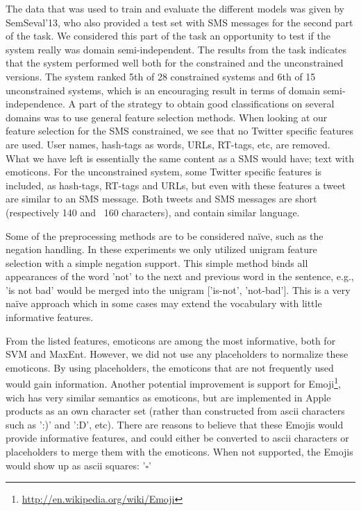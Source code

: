 The data that was used to train and evaluate the different models was given by SemSeval'13, who also provided a test set with SMS messages for the second part of the task. We considered this part of the task an opportunity to test if the system really was domain semi-independent. The results from the task indicates that the system performed well both for the constrained and the unconstrained versions. The system ranked 5th of 28 constrained systems and 6th of 15 unconstrained systems, which is an encouraging result in terms of domain semi-independence. A part of the strategy to obtain good classifications on several domains was to use general feature selection methods. When looking at our feature selection for the SMS constrained, we see that no Twitter specific features are used. User names, hash-tags as words, URLs, RT-tags, etc, are removed. What we have left is essentially the same content as a SMS would have; text with emoticons. For the unconstrained system, some Twitter specific features is included, as hash-tags, RT-tags and URLs, but even with these features a tweet are similar to an SMS message. Both tweets and SMS messages are short (respectively 140 and ~160 characters), and contain similar language. 

Some of the preprocessing methods are to be considered na\"{i}ve, such as the negation handling. In these experiments we only utilized unigram feature selection with a simple negation support. This simple method binds all appearances of the word 'not' to the next and previous word in the sentence, e.g., 'is not bad' would be merged into the unigram ['is-not', 'not-bad']. This is a very na\"{i}ve approach which in some cases may extend the vocabulary with little informative features.

From the listed features, emoticons are among the most informative, both for SVM and MaxEnt. However, we did not use any placeholders to normalize these emoticons. By using placeholders, the emoticons that are not frequently used would gain information. Another potential improvement is support for Emoji\footnote{\url{http://en.wikipedia.org/wiki/Emoji}}, wich has very similar semantics as emoticons, but are implemented in Apple products as an own character set (rather than constructed from ascii characters such as ':)' and ':D', etc). There are reasons to believe that these Emojis would provide informative features, and could either be converted to ascii characters or placeholders to merge them with the emoticons. When not supported, the Emojis would show up as ascii squares: '$\square$'

